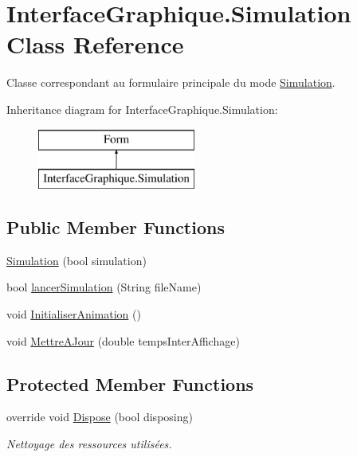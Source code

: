 \hypertarget{class_interface_graphique_1_1_simulation}{}\section{Interface\+Graphique.\+Simulation Class Reference}
\label{class_interface_graphique_1_1_simulation}


Classe correspondant au formulaire principale du mode \hyperlink{class_interface_graphique_1_1_simulation}{Simulation}.  


Inheritance diagram for Interface\+Graphique.\+Simulation\+:\begin{figure}[H]
\begin{center}
\leavevmode
\includegraphics[height=2.000000cm]{class_interface_graphique_1_1_simulation}
\end{center}
\end{figure}
\subsection*{Public Member Functions}
\begin{DoxyCompactItemize}
\item 
\hyperlink{group__inf2990_ga7d6ebba081450e9f88a61ff43f537ada}{Simulation} (bool simulation)
\item 
bool \hyperlink{group__inf2990_ga6cc001ded93ee48b40da33f72d386fe4}{lancer\+Simulation} (String file\+Name)
\item 
void \hyperlink{group__inf2990_gaf2221c6ba6bf1e3363eb0ed409659d5f}{Initialiser\+Animation} ()
\item 
void \hyperlink{group__inf2990_ga33c14c5d308b60815fb13974f56f8b40}{Mettre\+A\+Jour} (double temps\+Inter\+Affichage)
\end{DoxyCompactItemize}
\subsection*{Protected Member Functions}
\begin{DoxyCompactItemize}
\item 
override void \hyperlink{class_interface_graphique_1_1_simulation_a30240e31a88406bda7e38a05771b4b97}{Dispose} (bool disposing)
\begin{DoxyCompactList}\small\item\em Nettoyage des ressources utilisées. \end{DoxyCompactList}\end{DoxyCompactItemize}


